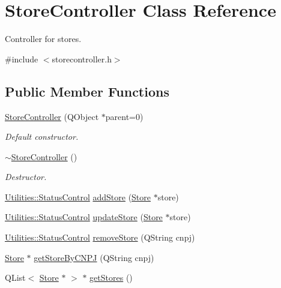 \hypertarget{class_store_controller}{\section{\-Store\-Controller \-Class \-Reference}
\label{class_store_controller}
}


\-Controller for stores.  




{\ttfamily \#include $<$storecontroller.\-h$>$}

\subsection*{\-Public \-Member \-Functions}
\begin{DoxyCompactItemize}
\item 
\hyperlink{class_store_controller_a0350d355891c6f006220bd1b9ece4daf}{\-Store\-Controller} (\-Q\-Object $\ast$parent=0)
\begin{DoxyCompactList}\small\item\em \-Default constructor. \end{DoxyCompactList}\item 
\hyperlink{class_store_controller_aacb70684c769795a59ae395af13405c0}{$\sim$\-Store\-Controller} ()
\begin{DoxyCompactList}\small\item\em \-Destructor. \end{DoxyCompactList}\item 
\hyperlink{class_utilities_a2974f062d85bdb0c444a1cbe554bf228}{\-Utilities\-::\-Status\-Control} \hyperlink{class_store_controller_ae7cf67c7ea3f7eb39cad31c62582546c}{add\-Store} (\hyperlink{class_store}{\-Store} $\ast$store)
\item 
\hyperlink{class_utilities_a2974f062d85bdb0c444a1cbe554bf228}{\-Utilities\-::\-Status\-Control} \hyperlink{class_store_controller_aed632eec1c4624dbffd2d877213477b7}{update\-Store} (\hyperlink{class_store}{\-Store} $\ast$store)
\item 
\hyperlink{class_utilities_a2974f062d85bdb0c444a1cbe554bf228}{\-Utilities\-::\-Status\-Control} \hyperlink{class_store_controller_afbc229ebd10ecc6a7d22674448623650}{remove\-Store} (\-Q\-String cnpj)
\item 
\hyperlink{class_store}{\-Store} $\ast$ \hyperlink{class_store_controller_a75032b0381cf56c1ee9da56cec93466c}{get\-Store\-By\-C\-N\-P\-J} (\-Q\-String cnpj)
\item 
\-Q\-List$<$ \hyperlink{class_store}{\-Store} $\ast$ $>$ $\ast$ \hyperlink{class_store_controller_a11bbd758711d536f78b824106835b75d}{get\-Stores} ()
\end{DoxyCompactItemize}


